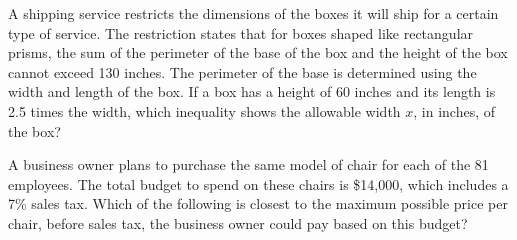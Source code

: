 


\newpage
\noindent\markforreview

\vspace{1em}

A shipping service restricts the dimensions of the boxes it will ship for a certain type of service. The restriction states that for boxes shaped like rectangular prisms, the sum of the perimeter of the base of the box and the height of the box cannot exceed 130 inches. The perimeter of the base is determined using the width and length of the box. If a box has a height of 60 inches and its length is 2.5 times the width, which inequality shows the allowable width \( x \), in inches, of the box?

\vspace{0.75em}


\vspace{2em}

\noindent\markforreview

\vspace{1em}

A business owner plans to purchase the same model of chair for each of the 81 employees. The total budget to spend on these chairs is \$14,000, which includes a 7\% sales tax. Which of the following is closest to the maximum possible price per chair, before sales tax, the business owner could pay based on this budget?

